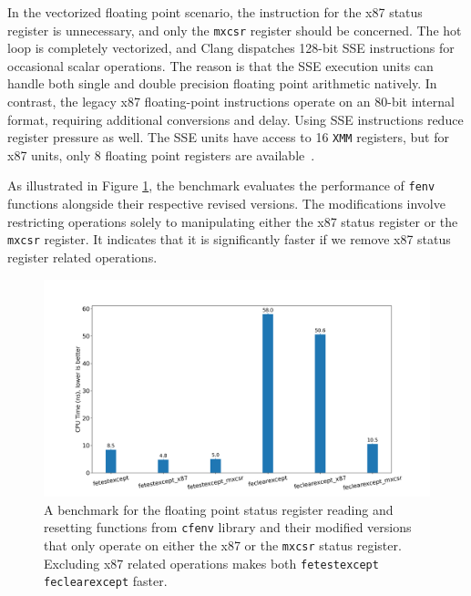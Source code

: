 \documentclass[logo,bsc,singlespacing,parskip]{infthesis}
\newcommand{\mxcsr}{\texttt{mxcsr}}
\newcommand{\xmm}{\texttt{XMM}}
\begin{document}
In the vectorized floating point scenario, the instruction for the x87 status
register is unnecessary, and only the \mxcsr{} register should be concerned. The
hot loop is completely vectorized, and Clang dispatches 128-bit SSE
instructions for occasional scalar operations. The reason is that the SSE
execution units can handle both single and double precision floating point
arithmetic natively. In contrast, the legacy x87 floating-point instructions operate
on an 80-bit internal format, requiring additional conversions and delay. Using
SSE instructions reduce register pressure as well. The SSE
units have access to 16 \xmm{} registers, but for x87 units, only 8
floating point registers are available~\cite{x87-bad}. 


As illustrated in Figure \ref{plot_fenv}, the benchmark evaluates the
performance of \texttt{fenv} functions alongside their respective revised
versions. The modifications involve restricting operations solely to
manipulating either the x87 status register or the \mxcsr{} register. It
indicates that it is significantly faster if we remove x87 status register
related operations. 

\begin{figure}[H]\captionsetup{name=Figure}
    \begin{center}
    \includegraphics[width=\linewidth]{image/bench_fenv.png}
    \end{center}
    \caption{A benchmark for the floating point status register reading and
resetting functions from \texttt{cfenv} library and their modified versions that
only operate on either the x87 or the \mxcsr{} status register. Excluding x87
related operations makes both \texttt{fetestexcept} \texttt{feclearexcept}
faster.}
    \label{plot_fenv}
\end{figure}
\normalsize
\end{document}
